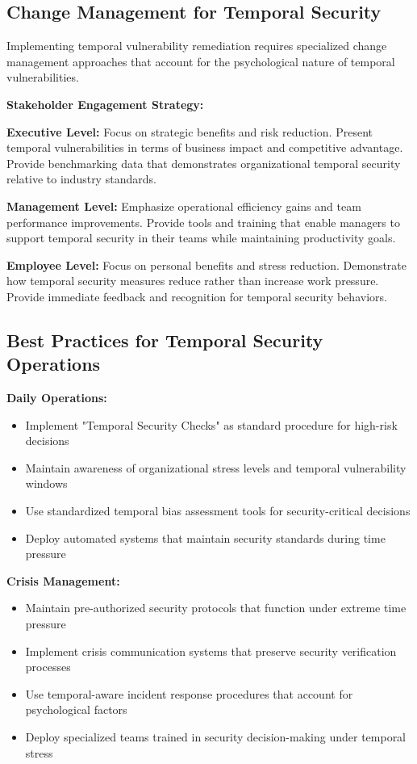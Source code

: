 \documentclass[11pt,a4paper]{article}
\begin{document}
\subsection{Change Management for Temporal Security}

Implementing temporal vulnerability remediation requires specialized change management approaches that account for the psychological nature of temporal vulnerabilities.

\textbf{Stakeholder Engagement Strategy:}

\textbf{Executive Level:} Focus on strategic benefits and risk reduction. Present temporal vulnerabilities in terms of business impact and competitive advantage. Provide benchmarking data that demonstrates organizational temporal security relative to industry standards.

\textbf{Management Level:} Emphasize operational efficiency gains and team performance improvements. Provide tools and training that enable managers to support temporal security in their teams while maintaining productivity goals.

\textbf{Employee Level:} Focus on personal benefits and stress reduction. Demonstrate how temporal security measures reduce rather than increase work pressure. Provide immediate feedback and recognition for temporal security behaviors.

\subsection{Best Practices for Temporal Security Operations}

\textbf{Daily Operations:}
\begin{itemize}
\item Implement "Temporal Security Checks" as standard procedure for high-risk decisions
\item Maintain awareness of organizational stress levels and temporal vulnerability windows
\item Use standardized temporal bias assessment tools for security-critical decisions
\item Deploy automated systems that maintain security standards during time pressure
\end{itemize}

\textbf{Crisis Management:}
\begin{itemize}
\item Maintain pre-authorized security protocols that function under extreme time pressure
\item Implement crisis communication systems that preserve security verification processes
\item Use temporal-aware incident response procedures that account for psychological factors
\item Deploy specialized teams trained in security decision-making under temporal stress
\end{itemize}
\end{document}
